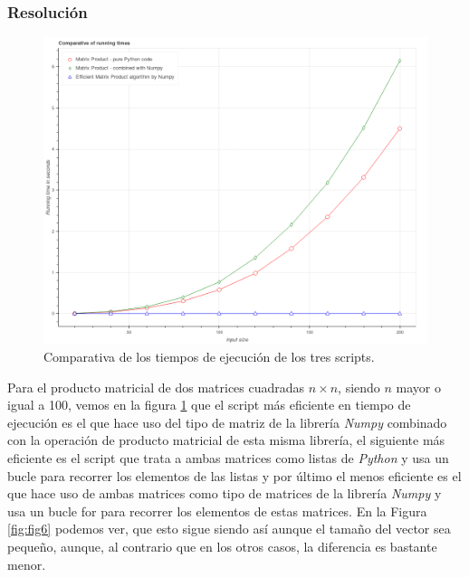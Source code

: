 \documentclass[12pt,twoside]{article}
\begin{document}
\subsubsection{Resolución}

\begin{figure}[hbt]
\begin{center}
	\includegraphics[width=1\textwidth]{41.png}
	\caption{Comparativa de los tiempos de ejecución de los tres scripts.}
	\label{fig:fig5}
\end{center}
\end{figure}

Para el producto matricial de dos matrices cuadradas $n \times n$, siendo $n$ mayor o igual a 100, vemos en la figura \ref{fig:fig5} que el script más eficiente en tiempo de ejecución es el que hace uso del tipo de matriz de la librería \textit{Numpy} combinado con la operación de producto matricial de esta misma librería, el siguiente más eficiente es el script que trata a ambas matrices como listas de \textit{Python} y usa un bucle para recorrer los elementos de las listas y por último el menos eficiente es el que hace uso de ambas matrices como tipo de matrices de la librería \textit{Numpy} y usa un bucle for para recorrer los elementos de estas matrices. En la Figura \ref{fig:fig6} podemos ver, que esto sigue siendo así aunque el tamaño del vector sea pequeño, aunque, al contrario que en los otros casos, la diferencia es bastante menor.

\end{document}
